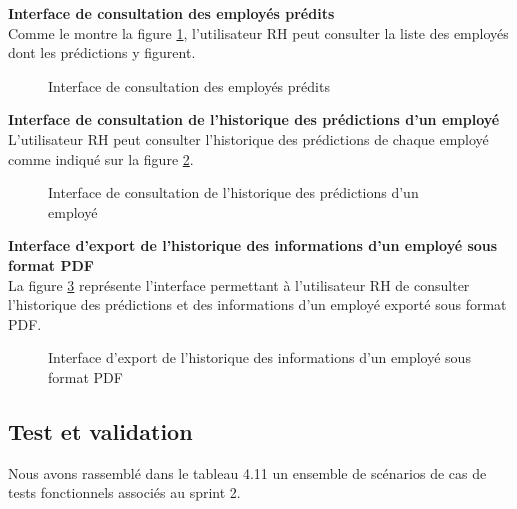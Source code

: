 \textbf{Interface de consultation des employés prédits}\\
Comme le montre la figure \ref{fig:realisationPFe_sprint2_prediction_list}, l'utilisateur RH peut consulter la liste des employés dont les prédictions y figurent.
    \begin{figure}[htpb]
    \centering
    \caption{Interface de consultation des employés prédits}
    \label{fig:realisationPFe_sprint2_prediction_list}
    \end{figure}


\textbf{Interface de consultation de l'historique des prédictions d'un employé}\\
L'utilisateur RH peut consulter l'historique des prédictions de chaque employé comme indiqué sur la figure \ref{fig:realisationPFe_sprint2_prediction_histo}.
    \begin{figure}[htpb]
    \centering
    \caption{Interface de consultation de l'historique des prédictions d'un employé}
    \label{fig:realisationPFe_sprint2_prediction_histo}
    \end{figure}

\newpage

\textbf{Interface d'export de l'historique des informations d'un employé sous format PDF}\\
La figure \ref{fig:realisationPFe_sprint2_prediction_export} représente l’interface permettant à l’utilisateur RH de consulter l'historique des prédictions et des informations d'un employé exporté sous format PDF.


    \begin{figure}[htpb]
    \centering
    \caption{Interface d'export de l'historique des informations d'un employé sous format PDF}
    \label{fig:realisationPFe_sprint2_prediction_export}
    \end{figure}

\subsection{Test et validation}
Nous avons rassemblé dans le tableau 4.11 un ensemble de scénarios de cas de tests fonctionnels associés au sprint 2.

